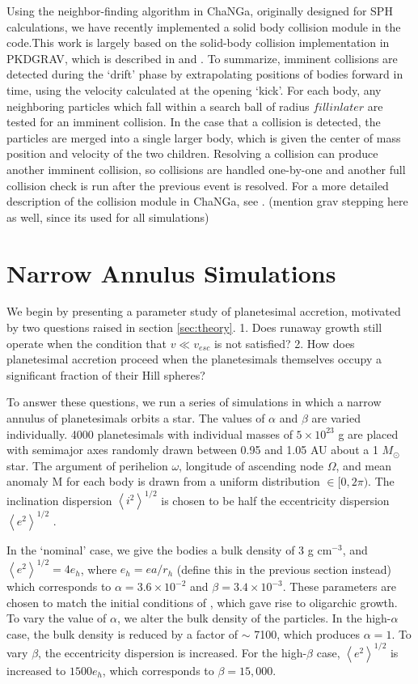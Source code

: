 \documentclass[twocolumn]{aastex63}
\begin{document}
Using the neighbor-finding algorithm in {\sc ChaNGa}, originally designed for SPH calculations, we have recently implemented a solid body collision module in the code.This work is largely based on the solid-body collision implementation in {\sc PKDGRAV}, which is described in \citet{richardson94} and \citet{richardson00}. To summarize, imminent collisions are detected during the `drift' phase by extrapolating positions of bodies forward in time, using the velocity calculated at the opening `kick'. For each body, any neighboring particles which fall within a search ball of radius $fill in later$ are tested for an imminent collision. In the case that a collision is detected, the particles are merged into a single larger body, which is given the center of mass position and velocity of the two children. Resolving a collision can produce another imminent collision, so collisions are handled one-by-one and another full collision check is run after the previous event is resolved. For a more detailed description of the collision module in {\sc ChaNGa}, see \citep{wallace19}. (mention grav stepping here as well, since its used for all simulations)

\section{Narrow Annulus Simulations}\label{sec:narrow}

We begin by presenting a parameter study of planetesimal accretion, motivated by two questions raised in section \ref{sec:theory}. 1. Does runaway growth still operate when the condition that $v \ll v_{esc}$ is not satisfied? 2. How does planetesimal accretion proceed when the planetesimals themselves occupy a significant fraction of their Hill spheres?

To answer these questions, we run a series of simulations in which a narrow annulus of planetesimals orbits a star. The values of $\alpha$ and $\beta$ are varied individually. 4000 planetesimals with individual masses of $5 \times 10^{23}$ g are placed with semimajor axes randomly drawn between 0.95 and 1.05 AU about a 1 $M_{\odot}$ star. The argument of perihelion $\omega$, longitude of ascending node $\Omega$, and mean anomaly M for each body is drawn from a uniform distribution $\in [0, 2 \pi)$. The inclination dispersion $\left< i^{2} \right>^{1/2}$ is chosen to be half the eccentricity dispersion $\left< e^{2} \right>^{1/2}$ \citep{ida93a}.

In the `nominal' case, we give the bodies a bulk density of 3 g cm$^{-3}$, and $\left< e^{2} \right>^{1/2} = 4 e_{h}$, where $e_{h} = e a/r_{h}$ (define this in the previous section instead) which corresponds to $\alpha = 3.6 \times 10^{-2}$ and $\beta = 3.4 \times 10^{-3}$. These parameters are chosen to match the initial conditions of \citet{kokubo98}, which gave rise to oligarchic growth. To vary the value of $\alpha$, we alter the bulk density of the particles. In the high-$\alpha$ case, the bulk density is reduced by a factor of $\sim$ 7100, which produces $\alpha = 1$. To vary $\beta$, the eccentricity dispersion is increased. For the high-$\beta$ case, $\left< e^{2} \right>^{1/2}$ is increased to $1500 e_{h}$, which corresponds to $\beta = 15,000$.
\end{document}
